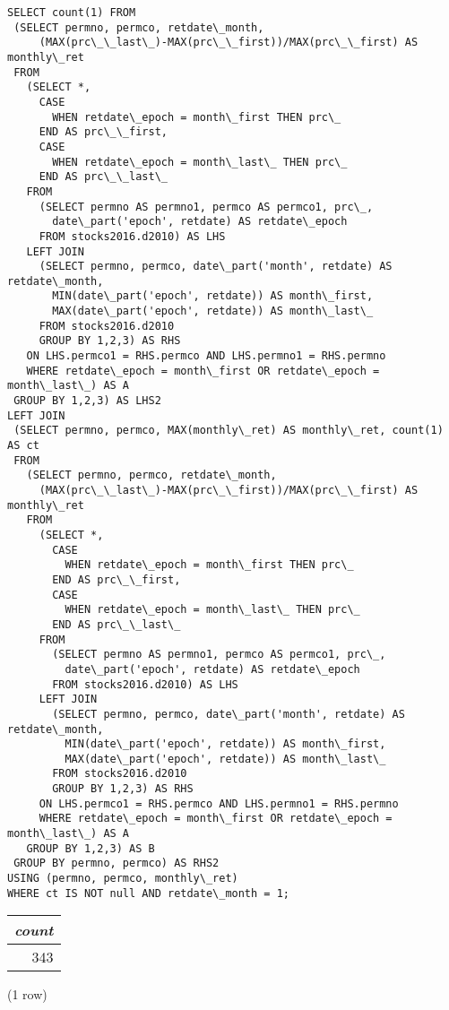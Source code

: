 \documentclass[]{article}
\begin{document}
\color{blue}
\begin{verbatim}
SELECT count(1) FROM
 (SELECT permno, permco, retdate\_month,
     (MAX(prc\_\_last\_)-MAX(prc\_\_first))/MAX(prc\_\_first) AS monthly\_ret
 FROM
   (SELECT *,
     CASE
       WHEN retdate\_epoch = month\_first THEN prc\_
     END AS prc\_\_first,
     CASE
       WHEN retdate\_epoch = month\_last\_ THEN prc\_
     END AS prc\_\_last\_
   FROM
     (SELECT permno AS permno1, permco AS permco1, prc\_,
       date\_part('epoch', retdate) AS retdate\_epoch
     FROM stocks2016.d2010) AS LHS
   LEFT JOIN
     (SELECT permno, permco, date\_part('month', retdate) AS retdate\_month,
       MIN(date\_part('epoch', retdate)) AS month\_first,
       MAX(date\_part('epoch', retdate)) AS month\_last\_
     FROM stocks2016.d2010
     GROUP BY 1,2,3) AS RHS
   ON LHS.permco1 = RHS.permco AND LHS.permno1 = RHS.permno
   WHERE retdate\_epoch = month\_first OR retdate\_epoch = month\_last\_) AS A
 GROUP BY 1,2,3) AS LHS2
LEFT JOIN
 (SELECT permno, permco, MAX(monthly\_ret) AS monthly\_ret, count(1) AS ct
 FROM
   (SELECT permno, permco, retdate\_month,
     (MAX(prc\_\_last\_)-MAX(prc\_\_first))/MAX(prc\_\_first) AS monthly\_ret
   FROM
     (SELECT *,
       CASE
         WHEN retdate\_epoch = month\_first THEN prc\_
       END AS prc\_\_first,
       CASE
         WHEN retdate\_epoch = month\_last\_ THEN prc\_
       END AS prc\_\_last\_
     FROM
       (SELECT permno AS permno1, permco AS permco1, prc\_,
         date\_part('epoch', retdate) AS retdate\_epoch
       FROM stocks2016.d2010) AS LHS
     LEFT JOIN
       (SELECT permno, permco, date\_part('month', retdate) AS retdate\_month,
         MIN(date\_part('epoch', retdate)) AS month\_first,
         MAX(date\_part('epoch', retdate)) AS month\_last\_
       FROM stocks2016.d2010
       GROUP BY 1,2,3) AS RHS
     ON LHS.permco1 = RHS.permco AND LHS.permno1 = RHS.permno
     WHERE retdate\_epoch = month\_first OR retdate\_epoch = month\_last\_) AS A
   GROUP BY 1,2,3) AS B
 GROUP BY permno, permco) AS RHS2
USING (permno, permco, monthly\_ret)
WHERE ct IS NOT null AND retdate\_month = 1;
\end{verbatim}
\color{black}

\begin{center}
\begin{tabular}{r}
\textit{count} \\
\hline
343 \\
\end{tabular}

\noindent (1 row) \\
\end{center}
\end{document}
